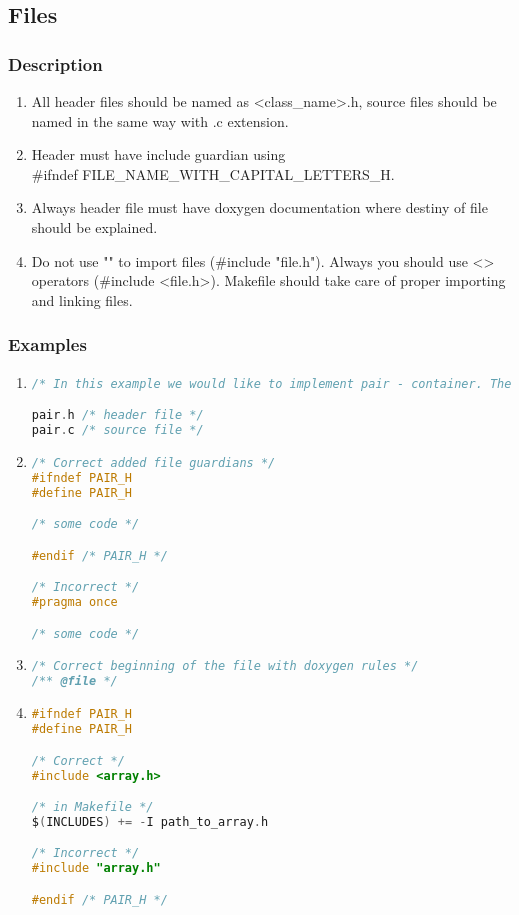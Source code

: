 \subsection{Files}
\subsubsection{Description}
    \begin{enumerate}
        \item All header files should be named as <class\_name>.h, source files should be named in the same way with .c extension.
        \item Header must have include guardian using \\ 
        \#ifndef FILE\_NAME\_WITH\_CAPITAL\_LETTERS\_H.
        \item Always header file must have \@file doxygen documentation where destiny of file should be explained.
        \item Do not use "" to import files (\#include "file.h"). Always you should use <> operators (\#include <file.h>). Makefile should take care of proper importing and linking files.
    \end{enumerate}

\subsubsection{Examples}
\begin{enumerate}
    \item 
\begin{lstlisting}[language=C,style=C99]
/* In this example we would like to implement pair - container. These names are correct */

pair.h /* header file */
pair.c /* source file */
\end{lstlisting}
 
    \item 
\begin{lstlisting}[language=C,style=C99]
/* Correct added file guardians */
#ifndef PAIR_H
#define PAIR_H

/* some code */

#endif /* PAIR_H */

/* Incorrect */
#pragma once

/* some code */
\end{lstlisting}

    \item 
\begin{lstlisting}[language=C,style=C99]
/* Correct beginning of the file with doxygen rules */
/** @file */ 
\end{lstlisting}

    \item 
\begin{lstlisting}[language=C,style=C99]
#ifndef PAIR_H
#define PAIR_H

/* Correct */
#include <array.h>

/* in Makefile */
$(INCLUDES) += -I path_to_array.h

/* Incorrect */
#include "array.h"

#endif /* PAIR_H */
\end{lstlisting}
\end{enumerate}

